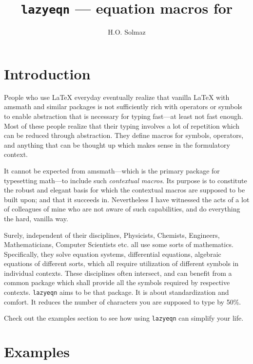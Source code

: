 \documentclass[DIV15]{scrartcl}
\title{\texttt{lazyeqn}\textnormal{ --- equation macros for \LaTeXe}}
\author{H.O. Solmaz}
\begin{document}
\maketitle

\section{Introduction}

People who use \LaTeX{} everyday eventually realize that vanilla \LaTeX{} with
amsmath and similar packages is not sufficiently rich with operators or
symbols to enable abstraction that is necessary for typing fast---at least not
fast enough. Most of these people realize that their typing involves a lot of
repetition which can be reduced through abstraction. They define macros for
symbols, operators, and anything that can be thought up which makes sense in the
formulatory context.

It cannot be expected from amsmath---which is the primary package for
typesetting math---to include such \emph{contextual macros}. Its purpose is to
constitute the robust and elegant basis for which the contextual macros are
supposed to be built upon; and that it succeeds in. Nevertheless I have
witnessed the acts of a lot of colleagues of mine who are not aware of such
capabilities, and do everything the hard, vanilla way.

Surely, independent of their disciplines, Physicists, Chemists, Engineers,
Mathematicians, Computer Scientists etc. all use some sorts of mathematics.
Specifically, they solve equation systems, differential equations, algebraic
equations of different sorts, which all require utilization of different symbols
in individual contexts. These disciplines often intersect, and can benefit from
a common package which shall provide all the symbols required by respective
contexts. \texttt{lazyeqn} aims to be that package. It is about standardization and
comfort. It reduces the number of characters you are supposed to type by 50\%.

Check out the examples section to see how using \texttt{lazyeqn} can simplify
your life.
\section{Examples}
\end{document}
